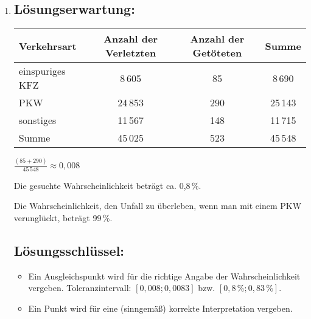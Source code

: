 \begin{langesbeispiel}
{\begin{enumerate}
\item \subsection{Lösungserwartung:}
			\begin{tabular}{|l|c|c|c|}\hline
			Verkehrsart&Anzahl der Verletzten&Anzahl der Getöteten&\cellcolor[gray]{0.9}Summe\\ \hline
			einspuriges KFZ&8\,605&85&\cellcolor[gray]{0.9}8\,690\\ \hline
			PKW&24\,853&290&\cellcolor[gray]{0.9}25\,143\\ \hline
			sonstiges&11\,567&148&\cellcolor[gray]{0.9}11\,715\\ \hline
			\cellcolor[gray]{0.9}Summe&\cellcolor[gray]{0.9}45\,025&\cellcolor[gray]{0.9}523&\cellcolor[gray]{0.9}45\,548\\ \hline			
			\end{tabular}
			
			$\frac{(85+290)}{45\,548}\approx 0,008$
			
			Die gesuchte Wahrscheinlichkeit beträgt ca. 0,8\,\%.
			
			Die Wahrscheinlichkeit, den Unfall zu überleben, wenn man mit einem PKW verunglückt, beträgt 99\,\%.
	\subsection{Lösungsschlüssel:}
	
\begin{itemize}
	\item Ein Ausgleichspunkt wird für die richtige Angabe der Wahrscheinlichkeit vergeben.  Toleranzintervall: $[0,008; 0,0083]$ bzw. $[0,8\,\%; 0,83\,\%]$.
	\item    Ein Punkt wird für eine (sinngemäß) korrekte Interpretation vergeben.
\end{itemize}
\end{enumerate}}
		\end{langesbeispiel}